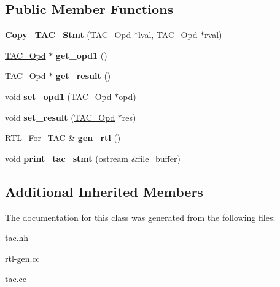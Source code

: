 \subsection*{Public Member Functions}
\begin{DoxyCompactItemize}
\item 
\mbox{\label{classCopy__TAC__Stmt_a0d220b873236ccfaa36817d0b92194e1}} 
{\bfseries Copy\+\_\+\+T\+A\+C\+\_\+\+Stmt} (\hyperlink{classTAC__Opd}{T\+A\+C\+\_\+\+Opd} $\ast$lval, \hyperlink{classTAC__Opd}{T\+A\+C\+\_\+\+Opd} $\ast$rval)
\item 
\mbox{\label{classCopy__TAC__Stmt_ac9ad0c26b1c3a67ed424cf452a46363c}} 
\hyperlink{classTAC__Opd}{T\+A\+C\+\_\+\+Opd} $\ast$ {\bfseries get\+\_\+opd1} ()
\item 
\mbox{\label{classCopy__TAC__Stmt_a85feb421fc1104ad32cc691d764adcfd}} 
\hyperlink{classTAC__Opd}{T\+A\+C\+\_\+\+Opd} $\ast$ {\bfseries get\+\_\+result} ()
\item 
\mbox{\label{classCopy__TAC__Stmt_ab2d3aed756b96c0eefa529e956dc83cb}} 
void {\bfseries set\+\_\+opd1} (\hyperlink{classTAC__Opd}{T\+A\+C\+\_\+\+Opd} $\ast$opd)
\item 
\mbox{\label{classCopy__TAC__Stmt_a5415734a3cb36d2407a9e0b13d96eda6}} 
void {\bfseries set\+\_\+result} (\hyperlink{classTAC__Opd}{T\+A\+C\+\_\+\+Opd} $\ast$res)
\item 
\mbox{\label{classCopy__TAC__Stmt_ad42a9d258277ca20846ffc141cd56392}} 
\hyperlink{classRTL__For__TAC}{R\+T\+L\+\_\+\+For\+\_\+\+T\+AC} \& {\bfseries gen\+\_\+rtl} ()
\item 
\mbox{\label{classCopy__TAC__Stmt_a83fcec2bcfc0ed3d45e0357154482f96}} 
void {\bfseries print\+\_\+tac\+\_\+stmt} (ostream \&file\+\_\+buffer)
\end{DoxyCompactItemize}
\subsection*{Additional Inherited Members}


The documentation for this class was generated from the following files\+:\begin{DoxyCompactItemize}
\item 
tac.\+hh\item 
rtl-\/gen.\+cc\item 
tac.\+cc\end{DoxyCompactItemize}
